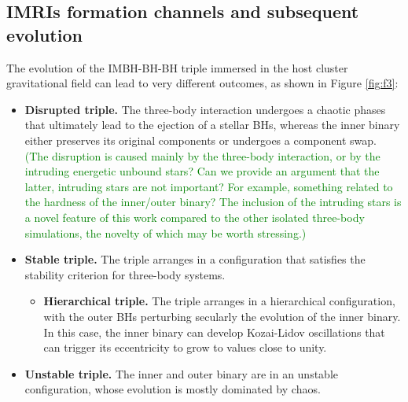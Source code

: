 \documentclass[twocolumn]{aastex62}
\newcommand{\xian}{\textcolor{green}}
\begin{document}
\subsection{IMRIs formation channels and subsequent evolution}
\label{sec:imris}
The evolution of the IMBH-BH-BH triple immersed in the host cluster gravitational field can lead to very different outcomes, as shown in Figure \ref{fig:f3}:
\begin{itemize}
    \item {\bf Disrupted triple.} The three-body interaction undergoes a chaotic phases that ultimately lead to the ejection of a stellar BHs, whereas the inner binary either preserves its original components or undergoes a component swap. 
\xian{(The disruption is caused mainly by the three-body interaction, or by the intruding
energetic unbound stars? Can we provide an argument that the latter, intruding stars are not
important? For example, something related to the hardness of the inner/outer binary? The
inclusion of the intruding stars is a novel feature of this work compared to the other
isolated three-body simulations, the novelty of which may be worth stressing.)}
    \item {\bf Stable triple.} The triple arranges in a configuration that satisfies the stability criterion for three-body systems. 
	\begin{itemize}
		\item {\bf Hierarchical triple.}  The triple arranges in a hierarchical configuration, with the outer BHs perturbing secularly the evolution of the inner binary. In this case, the inner binary can develop Kozai-Lidov oscillations \citep{kozai62,lidov62} that can trigger its eccentricity to grow to values close to unity. 
	\end{itemize}
    \item {\bf Unstable triple.} The inner and outer binary are in an unstable configuration, whose evolution is mostly dominated by chaos.
\end{itemize}
\end{document}
